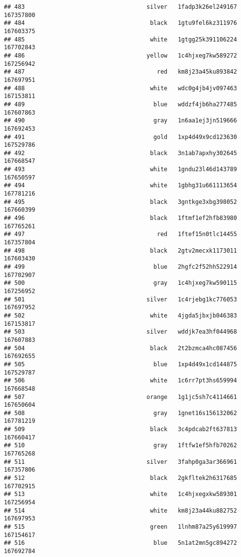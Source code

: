 \documentclass[
]{article}
\begin{document}
\begin{verbatim}
## 483                                   silver   1fadp3k26el249167 167357800
## 484                                    black   1gtu9fel6kz311976 167603375
## 485                                    white   1gtgg25k391106224 167702843
## 486                                   yellow   1c4hjxeg7kw589272 167256942
## 487                                      red   km8j23a45ku893842 167697951
## 488                                    white   wdc0g4jb4jv097463 167153811
## 489                                     blue   wddzf4jb6ha277485 167607863
## 490                                     gray   1n6aa1ej3jn519666 167692453
## 491                                     gold   1xp4d49x9cd123630 167529786
## 492                                    black   3n1ab7apxhy302645 167668547
## 493                                    white   1gndu23l46d143789 167650597
## 494                                    white   1gbhg31u661113654 167781216
## 495                                    black   3gntkge3xbg398052 167660399
## 496                                    black   1ftmf1ef2hfb83980 167765261
## 497                                      red   1ftef15n0tlc14455 167357804
## 498                                    black   2gtv2mecxk1173011 167603430
## 499                                     blue   2hgfc2f52hh522914 167702907
## 500                                     gray   1c4hjxeg7kw590115 167256952
## 501                                   silver   1c4rjebg1kc776053 167697952
## 502                                    white   4jgda5jbxjb046383 167153817
## 503                                   silver   wddjk7ea3hf044968 167607883
## 504                                    black   2t2bzmca4hc087456 167692655
## 505                                     blue   1xp4d49x1cd144875 167529787
## 506                                    white   1c6rr7pt3hs659994 167668548
## 507                                   orange   1g1jc5sh7c4114661 167650604
## 508                                     gray   1gnet16s156132062 167781219
## 509                                    black   3c4pdcab2ft637813 167660417
## 510                                     gray   1ftfw1ef5hfb70262 167765268
## 511                                   silver   3fahp0ga3ar366961 167357806
## 512                                    black   2gkfltek2h6317685 167702915
## 513                                    white   1c4hjxegxkw589301 167256954
## 514                                    white   km8j23a44ku882752 167697953
## 515                                    green   1lnhm87a25y619997 167154617
## 516                                     blue   5n1at2mn5gc894272 167692784

\end{verbatim}
\end{document}
